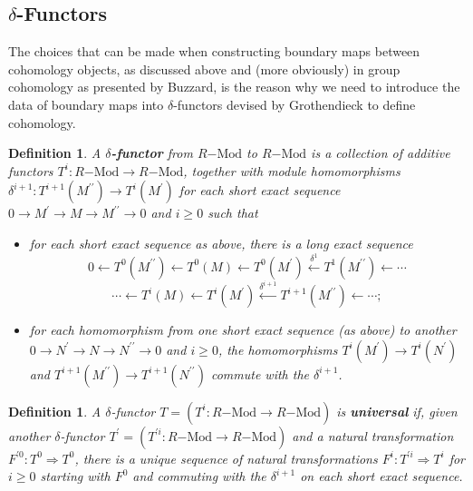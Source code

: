 \documentclass{amsart}
\theoremstyle{plain}
\numberwithin{equation}{section} %
\numberwithin{figure}{section} %
\theoremstyle{plain}
\theoremstyle{plain}
\theoremstyle{plain}
\theoremstyle{plain}
\theoremstyle{plain}
\theoremstyle{plain}
\newtheorem{Def}[thm]{Definition} %
\theoremstyle{remark}
\theoremstyle{remark}
\theoremstyle{remark}
\begin{document}
\subsection{$\delta$-Functors}

The choices that can be made when constructing boundary maps between cohomology objects, as discussed above and (more obviously) in group cohomology as presented by Buzzard, is the reason why we need to introduce the data of boundary maps into $\delta$-functors devised by Grothendieck to define cohomology.

\begin{Def}
A \textbf{$\delta$-functor} from $R\mathrm{-Mod}$ to $R\mathrm{-Mod}$ is a collection of additive functors $T^i: R\mathrm{-Mod} \rightarrow R\mathrm{-Mod}$, together with module homomorphisms $\delta^{i+1}: T^{i+1}(M^{\prime\prime}) \rightarrow T^i(M^\prime)$ for each short exact sequence $0 \rightarrow M^\prime \rightarrow M \rightarrow M^{\prime\prime} \rightarrow 0$ and $i \geq 0$ such that
\begin{itemize}
\item[(1)] for each short exact sequence as above, there is a long exact sequence
\[ 0 \leftarrow T^0(M^{\prime\prime}) \leftarrow T^0(M) \leftarrow T^0(M^\prime) 
             \stackrel{\delta^1}{\leftarrow} T^1(M^{\prime\prime}) \leftarrow \cdots \]
\[ \cdots \leftarrow T^i(M) \leftarrow T^i(M^{\prime}) 
             \stackrel{\delta^{i+1}}{\leftarrow} T^{i+1}(M^{\prime\prime}) \leftarrow \cdots ;\]
\item[(2)] for each homomorphism from one short exact sequence (as above) to another $0 \rightarrow N^\prime \rightarrow N \rightarrow N^{\prime\prime} \rightarrow 0$ and $i \geq 0$, the homomorphisms $T^i(M^{\prime}) \rightarrow T^i(N^{\prime})$ and $T^{i+1}(M^{\prime\prime}) \rightarrow T^{i+1}(N^{\prime\prime})$ commute with the $\delta^{i+1}$.
\end{itemize} 
\end{Def}

\begin{Def}
A $\delta$-functor $T = (T^i: R\mathrm{-Mod} \rightarrow R\mathrm{-Mod})$ is \textbf{universal} if, given another $\delta$-functor $T^\prime = (T^{\prime i}: R\mathrm{-Mod} \rightarrow R\mathrm{-Mod})$ and a natural transformation $F^{\prime 0}: T^0 \Rightarrow T^0$, there is a unique sequence of natural transformations $F^i: T^{\prime i} \Rightarrow T^i$ for $i \geq 0$ starting with $F^0$ and commuting with the $\delta^{i+1}$ on each short exact sequence.
\end{Def}
\end{document}
